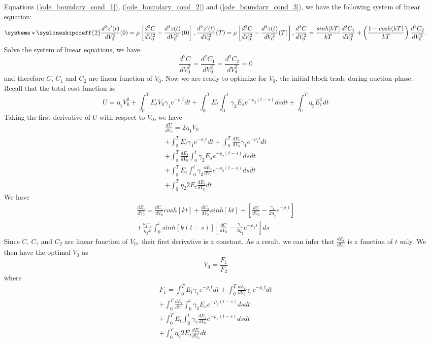 \documentclass{article}
\begin{document}
Equations (\ref{ode_boundary_cond_1}), (\ref{ode_boundary_cond_2}) and (\ref{ode_boundary_cond_3}), we have the following system of linear equation:
\[
\systeme*{
\syslineskipcoeff{2}
\frac{d^2z'(t)}{dV_0^2}(0) = \rho\left[ \frac{d^2C}{dV_0^2} - \frac{d^2z(t)}{dV_0^2}(0) \right],
\frac{d^2z'(t)}{dV_0^2}(T) = \rho\left[ \frac{d^2C}{dV_0^2} - \frac{d^2z(t)}{dV_0^2}(T) \right],
\frac{d^2C}{dV_0^2} = \frac{sinh[kT]}{kT} \frac{d^2C_1}{dV_0^2} + \left(\frac{1-cosh(kT)}{kT}\right)\frac{d^2C_2}{dV_0^2}
}.
\]
Solve the system of linear equations, we have
\[
\frac{d^2C}{dV_0^2} =  \frac{d^2C_1}{dV_0^2} =  \frac{d^2C_2}{dV_0^2} = 0 
\]
and therefore $C$, $C_1$ and $C_2$ are linear function of $V_0$. Now we are ready to optimize for $V_0$, the initial block trade during auction phase. Recall that the total cost function is:
\[
U = \eta_1 V_0^2  + \int_0^T E_t V_0 \gamma_1 e^{-\rho_1 t} dt + \int_0^T E_t \int_0^t  \gamma_2 E_s e^{-\rho_2 (t-s)} ds dt  + \int_0^T \eta_2 E_t^2 dt
\]
Taking the first derivative of $U$ with respect to $V_0$, we have 
\[
\begin{aligned}
\frac{dU}{dV_0} = 2 \eta_1 V_0 \\
+ \int_0^T E_t \gamma_1 e^{-\rho_1 t} dt + \int_0^T \frac{dE_t}{dV_0} \gamma_1 e^{-\rho_1 t} dt \\
+ \int_0^T \frac{dE_t}{dV_0} \int_0^t  \gamma_2 E_s e^{-\rho_2(t-s)} ds dt\\
+ \int_0^T E_t \int_0^t  \gamma_2 \frac{dE_s}{dV_0} e^{-\rho_2(t-s)} ds dt \\
+ \int_0^T \eta_2 2 E_t \frac{dE_t}{dV_0} dt
\end{aligned}
\]
We have 
\[
\begin{aligned}
\frac{dE_t}{dV_0} = \frac{dC_1}{dV_0} cosh[k t]+ \frac{dC_2}{dV_0}  sinh[k t] + [\frac{dC}{dV_0} - \frac{\gamma_1}{2 \eta_2} e^{-\rho_1 t}] \\
+ \frac{\rho_2 \gamma_2}{\eta_2 k}\int_0^t sinh[k(t-s)] [\frac{dC}{dV_0}- \frac{\gamma_1}{2 \eta_2} e^{-\rho_1 s}]ds
\end{aligned}
\]
Since $C$, $C_1$ and $C_2$ are linear function of $V_0$, their first derivative is a constant. As a result, we can infer that $\frac{dE_t}{dV_0}$ is a function of $t$ only. We then have the optimal $V_0$ as
\[
V_0 = \frac{F_1}{F_2}
\]
where 
\[
\begin{aligned}
F_1 =  \int_0^T E_t \gamma_1 e^{-\rho_1 t} dt + \int_0^T \frac{dE_t}{dV_0} \gamma_1 e^{-\rho_1 t} dt \\
+ \int_0^T \frac{dE_t}{dV_0} \int_0^t  \gamma_2 E_s e^{-\rho_2(t-s)} ds dt\\
+ \int_0^T E_t \int_0^t  \gamma_2 \frac{dE_s}{dV_0} e^{-\rho_2(t-s)} ds dt\\
+ \int_0^T \eta_2 2 E_t \frac{dE_t}{dV_0} dt
\end{aligned}
\]
\end{document}
